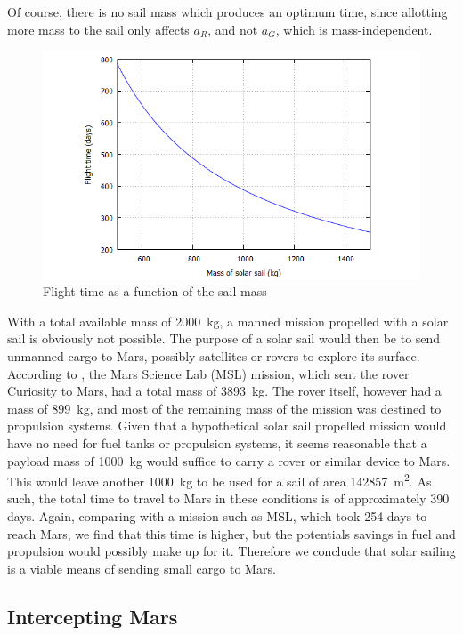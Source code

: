 \documentclass[twocolumn,12pt,a4paper]{article}
\numberwithin{equation}{section}
\begin{document}
Of course, there is no sail mass which produces an optimum time, since allotting more mass to the sail only affects \( a_R \), and not \( a_G \), which is mass-independent. 

\begin{figure}
	\centering
	\includegraphics[scale=0.35]{time}
	\caption{Flight time as a function of the sail mass}
	\label{fig:time of flight}
\end{figure}

With a total available mass of \SI{2000}{kg}, a manned mission propelled with a solar sail is obviously not possible. The purpose of a solar sail would then be to send unmanned cargo to Mars, possibly satellites or rovers to explore its surface. According to \cite{presskit}, the Mars Science Lab (MSL) mission, which sent the rover Curiosity to Mars, had a total mass of \SI{3893}{kg}. The rover itself, however had a mass of \SI{899}{kg}, and most of the remaining mass of the mission was destined to propulsion systems. Given that a hypothetical solar sail propelled mission would have no need for fuel tanks or propulsion systems, it seems reasonable that a payload mass of \SI{1000}{kg} would suffice to carry a rover or similar device to Mars. This would leave another \SI{1000}{kg} to be used for a sail of area \SI{142857}{m^2}. As such, the total time to travel to Mars in these conditions is of approximately 390 days. Again, comparing with a mission such as MSL, which took 254 days to reach Mars, we find that this time is higher, but the potentials savings in fuel and propulsion would possibly make up for it. Therefore we conclude that solar sailing is a viable means of sending small cargo to Mars. 

\subsection{Intercepting Mars}
\end{document}
